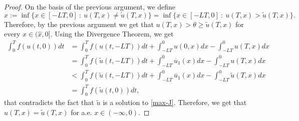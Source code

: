 \documentclass[a4paper, 10pt, final]{article}
\newcommand{\maurotx}[1]{{\color{blue} [Mauro]: {#1}}}
\begin{document}
\begin{proof}
  On the basis of the previous argument,  we define 
  \begin{equation*}
    \hat x:= \inf\{x\in [-LT,0]\ :\ u(T,x)\neq \widetilde u(T,x)\}= \inf\{x\in [-LT,0]\ :\ u(T,x)> \widetilde u(T,x)\}.
  \end{equation*}
  Therefore, by the previous argument we get that $u(T,x)>\theta\geq \widetilde u(T,x)$ for every $x\in (\hat{x}, 0]$. 
  Using the Divergence Theorem, 
  we get
  \begin{align*}
    \int_0^T f(u(t,0))dt
    & = \int_0^T f(u(t, -LT))dt + \int_{-LT}^0 u(0,x)dx -\int_{-LT}^0 u(T,x)dx
    \\
    & = \int_0^T f(\widetilde u(t, -LT))dt + \int_{-LT}^0 \overline u_1(x)dx -\int_{-LT}^0 u(T,x)dx
    \\
    & < \int_0^T f(\widetilde u(t, -LT))dt + \int_{-LT}^0 \overline u_1(x)dx -\int_{-LT}^0 \widetilde u(T,x)dx
    \\
    & = \int_0^T f(\widetilde u(t,0))dt, 
  \end{align*}
  that contradicts the fact that $\widetilde u$ is a solution to \eqref{max-J}.
  Therefore, we get that $u(T,x)=\widetilde u(T,x)$ for a.e. $x\in ( -\infty,0)$. 
  \end{proof} 
\end{document}
